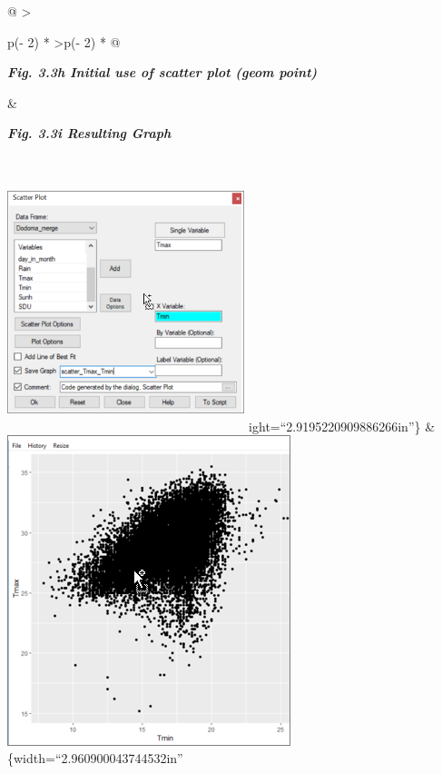 \documentclass[
  letterpaper,
  DIV=11,
  numbers=noendperiod]{scrreprt}
\begin{document}
\begin{longtable}[]{@{}
  >{\raggedright\arraybackslash}p{(\columnwidth - 2\tabcolsep) * }
  >{\centering\arraybackslash}p{(\columnwidth - 2\tabcolsep) * }@{}}
\toprule\noalign{}
\begin{minipage}[b]{\linewidth}\raggedright
\textbf{\emph{Fig. 3.3h Initial use of scatter plot (geom point)}}
\end{minipage} & \begin{minipage}[b]{\linewidth}\centering
\textbf{\emph{Fig. 3.3i Resulting Graph}}
\end{minipage} \\
\midrule\noalign{}
\endhead
\bottomrule\noalign{}
\endlastfoot
\includegraphics[width=2.72331in,height=2.95417in]{figures/Fig3.3h.png}
ight=``2.9195220909886266in''\} &
\includegraphics{figures/Fig3.3i.png}\{width=``2.960900043744532in'' \\
\end{longtable}
\end{document}
